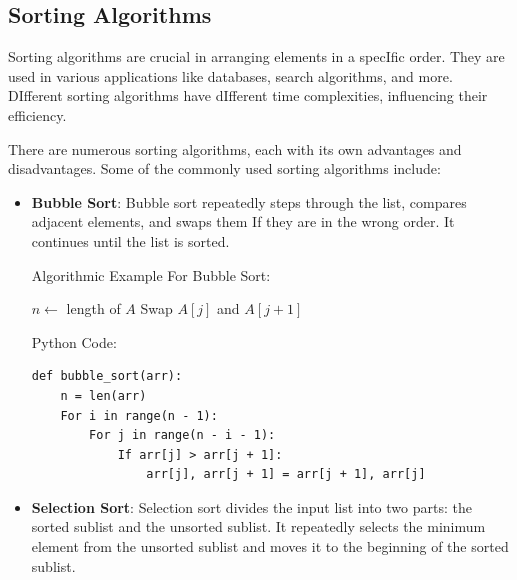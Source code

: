 \documentclass[12pt]{book} %
\begin{document}
\subsection{Sorting Algorithms}
Sorting algorithms are crucial in arranging elements in a specIfic order. They are used in various applications like databases, search algorithms, and more. DIfferent sorting algorithms have dIfferent time complexities, influencing their efficiency.

There are numerous sorting algorithms, each with its own advantages and disadvantages. Some of the commonly used sorting algorithms include:

\begin{itemize}
    \item \textbf{Bubble Sort}: Bubble sort repeatedly steps through the list, compares adjacent elements, and swaps them If they are in the wrong order. It continues until the list is sorted.

     Algorithmic Example For Bubble Sort:
     \FloatBarrier %
    \begin{algorithm}
\caption{Bubble Sort}
\begin{algorithmic}[1]
    \State $n \gets$ length of $A$
                \State Swap $A[j]$ and $A[j+1]$
            \EndIf
        \EndFor
    \EndFor
\EndFunction
\end{algorithmic}
\end{algorithm}
\FloatBarrier %
Python Code:
\FloatBarrier %
\begin{verbatim}
def bubble_sort(arr):
    n = len(arr)
    For i in range(n - 1):
        For j in range(n - i - 1):
            If arr[j] > arr[j + 1]:
                arr[j], arr[j + 1] = arr[j + 1], arr[j]
\end{verbatim}
    \item \textbf{Selection Sort}: Selection sort divides the input list into two parts: the sorted sublist and the unsorted sublist. It repeatedly selects the minimum element from the unsorted sublist and moves it to the beginning of the sorted sublist.
    

\end{itemize}
\end{document}
